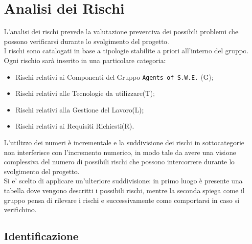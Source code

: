 \section{Analisi dei Rischi}
\label{RischiIntroduzione}

L'analisi dei rischi prevede la valutazione preventiva dei possibili problemi che possono verificarsi durante lo svolgimento del progetto. \\
I rischi sono catalogati in base a tipologie stabilite a priori all'interno del gruppo. 
Ogni rischio sarà inserito in una particolare categoria:
\begin{itemize}
\item Rischi relativi ai Componenti del Gruppo \texttt{Agents of S.W.E.} (G);
\item Rischi relativi alle Tecnologie da utilizzare(T);
\item Rischi relativi alla Gestione del Lavoro(L);
\item Rischi relativi ai Requisiti Richiesti(R).  
\end{itemize}

L'utilizzo dei numeri è incrementale e la suddivisione dei rischi in sottocategorie non interferisce con l'incremento numerico, in modo tale da avere una visione complessiva del numero di possibili rischi che possono intercorrere durante lo svolgimento del progetto. \\
Si e' scelto di applicare un'ulteriore suddivisione: in primo luogo è presente una tabella dove vengono descritti i possibili rischi, mentre la seconda spiega come il gruppo pensa di rilevare i rischi e successivamente come comportarsi in caso si verifichino.

\subsection{Identificazione}
\label{RischiIdentificazione}

